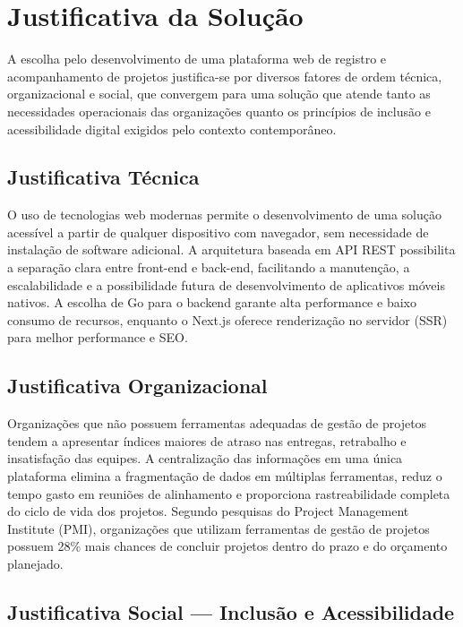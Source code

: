 \documentclass[a4paper,12pt,oneside]{article}
\begin{document}
\section{Justificativa da Solução}

A escolha pelo desenvolvimento de uma plataforma web de registro e acompanhamento de projetos justifica-se por diversos fatores de ordem técnica, organizacional e social, que convergem para uma solução que atende tanto as necessidades operacionais das organizações quanto os princípios de inclusão e acessibilidade digital exigidos pelo contexto contemporâneo.

\subsection{Justificativa Técnica}

O uso de tecnologias web modernas permite o desenvolvimento de uma solução acessível a partir de qualquer dispositivo com navegador, sem necessidade de instalação de software adicional. A arquitetura baseada em API REST possibilita a separação clara entre front-end e back-end, facilitando a manutenção, a escalabilidade e a possibilidade futura de desenvolvimento de aplicativos móveis nativos. A escolha de Go para o backend garante alta performance e baixo consumo de recursos, enquanto o Next.js oferece renderização no servidor (SSR) para melhor performance e SEO.

\subsection{Justificativa Organizacional}

Organizações que não possuem ferramentas adequadas de gestão de projetos tendem a apresentar índices maiores de atraso nas entregas, retrabalho e insatisfação das equipes. A centralização das informações em uma única plataforma elimina a fragmentação de dados em múltiplas ferramentas, reduz o tempo gasto em reuniões de alinhamento e proporciona rastreabilidade completa do ciclo de vida dos projetos. Segundo pesquisas do Project Management Institute (PMI), organizações que utilizam ferramentas de gestão de projetos possuem 28\% mais chances de concluir projetos dentro do prazo e do orçamento planejado.

\subsection{Justificativa Social --- Inclusão e Acessibilidade}
\end{document}
